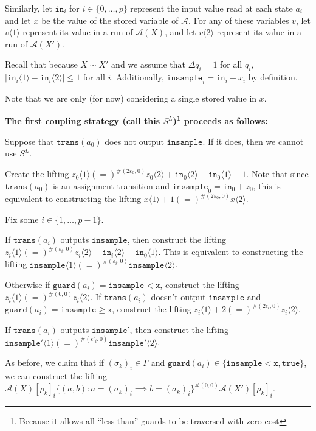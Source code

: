 \documentclass[12pt]{article}
\newcommand{\gguard}[1][x]{\texttt{insample}\geq \texttt{#1}}
\newcommand{\lguard}[1][x]{\texttt{insample} < \texttt{#1}}
\newcommand{\brangle}[1]{\langle #1 \rangle}
\newcommand{\guard}{\texttt{guard}}
\newcommand{\trans}{\texttt{trans}}
\theoremstyle{definition}
\begin{document}
Similarly, let $\texttt{in}_i$ for $i \in \{0,\ldots, p\}$ represent the input value read at each state $a_i$ and let $x$ be the value of the stored variable of $\mathcal{A}$. For any of these variables $v$, let $v\brangle{1}$ represent its value in a run of $\mathcal{A}(X)$, and let $v\brangle{2}$ represent its value in a run of $\mathcal{A}(X')$. 

Recall that because $X\sim X'$ and we assume that $\Delta q_i = 1$ for all $q_i$, $|\texttt{in}_i\brangle{1} - \texttt{in}_i\brangle{2}|\leq 1$ for all $i$. Additionally, $\texttt{insample}_i = \texttt{in}_i + x_i$ by definition.

Note that we are only (for now) considering a single stored value in $x$.

\textbf{The first coupling strategy (call this $S^L$)\footnote{Because it allows all ``less than'' guards to be traversed with zero cost} proceeds as follows:}

Suppose that $\trans(a_0)$ does not output $\texttt{insample}$. If it does, then we cannot use $S^L$.


Create the lifting $z_0\brangle{1} (=)^{\#(2\varepsilon_0, 0)} z_0\brangle{2} + \texttt{in}_0\brangle{2}- \texttt{in}_0\brangle{1} - 1$. 
Note that since $\trans(a_0)$ is an assignment transition and $\texttt{insample}_0 = \texttt{in}_0 + z_0$, this is equivalent to constructing the lifting $x\brangle{1} + 1 (=)^{\#(2\varepsilon_0, 0)}x\brangle{2}$. 

Fix some $i\in\{1, \ldots, p-1\}$. 

If $\trans(a_i)$ outputs $\texttt{insample}$, then construct the lifting $z_i\brangle{1} (=)^{\#(\varepsilon_i, 0)}z_i\brangle{2} + \texttt{in}_i\brangle{2}-\texttt{in}_0\brangle{1}$. This is equivalent to constructing the lifting $\texttt{insample}\brangle{1} (=)^{\#(\varepsilon_i, 0)}\texttt{insample}\brangle{2}$.


Otherwise if $\guard(a_i) = \lguard$, construct the lifting $z_i\brangle{1} (=)^{\#(0, 0)}z_i\brangle{2}$. If $\trans(a_i)$ doesn't output $\texttt{insample}$ and $\guard(a_i) = \gguard$, construct the lifting $z_i\brangle{1} + 2 (=)^{\#(2\epsilon_i, 0)}z_i\brangle{2}$. 

If $\trans(a_i)$ outputs $\texttt{insample'}$, then construct the lifting $\texttt{insample}'\brangle{1} (=)^{\#(\varepsilon'_i, 0)} \texttt{insample}'\brangle{2}$.


As before, we claim that if $(\sigma_k)_i \in \Gamma$ and $\guard(a_i) \in \{\lguard, \texttt{true}\}$, we can construct the lifting $\mathcal{A}(X)[\rho_k]_i\{(a, b): a = (\sigma_k)_i \implies b = (\sigma_k)_i\}^{\#(0, 0)}\mathcal{A}(X')[\rho_k]_i$. 
\end{document}
